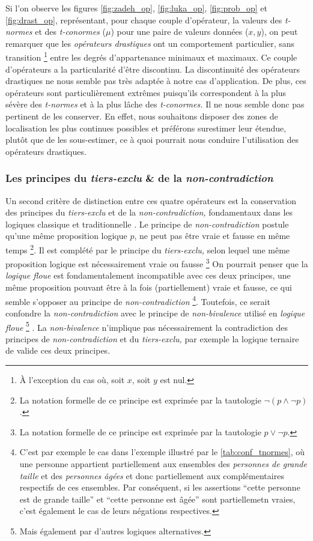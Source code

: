 Si l'on observe les figures \ref{fig:zadeh_op}, \ref{fig:luka_op},
\ref{fig:prob_op} et \ref{fig:drast_op}, représentant, pour chaque
couple d'opérateur, la valeurs des \emph{t-normes} et des
\emph{t-conormes} (\(\mu\)) pour une paire de valeurs données
(\(x,y\)), on peut remarquer que les \emph{opérateurs drastiques} ont
un comportement particulier, sans transition \footnote{À l'exception
  du cas où, soit \(x\), soit \(y\) est nul.} entre les degrés
d’appartenance minimaux et maximaux. Ce couple d'opérateurs a la
particularité d'être discontinu. La discontinuité des opérateurs
drastiques ne nous semble pas très adaptée à notre cas
d’application. De plus, ces opérateurs sont particulièrement extrêmes
puisqu'ils correspondent à la plus sévère des \emph{t-normes} et à la
plus lâche des \emph{t-conormes.} Il ne nous semble donc pas pertinent
de les conserver. En effet, nous souhaitons disposer des zones de
localisation les plus continues possibles et préférons surestimer leur
étendue, plutôt que de les sous-estimer, ce à quoi pourrait nous
conduire l'utilisation des opérateurs drastiques.

\subsubsection{Les principes du \emph{tiers-exclu} \& de la
  \emph{non-contradiction}}

Un second critère de distinction entre ces quatre opérateurs est la
conservation des principes du \emph{tiers-exclu} et de la
\emph{non-contradiction,} fondamentaux dans les logiques classique et
traditionnelle \autocite{Horn2018}. Le principe de
\emph{non-contradiction} postule qu'une même proposition logique
\(p\), ne peut pas être vraie et fausse en même temps \footnote{La
  notation formelle de ce principe est exprimée par la tautologie
  \(\neg(p \wedge \neg p) \).}. Il est complété par le principe du
\emph{tiers-exclu,} selon lequel une même proposition logique est
nécessairement vraie ou fausse \footnote{La notation formelle de ce
  principe est exprimée par la tautologie \(p \vee \neg p\).} On
pourrait penser que la \emph{logique floue} est fondamentalement
incompatible avec ces deux principes, une même proposition pouvant
être à la fois (partiellement) vraie et fausse, ce qui semble
s'opposer au principe de \emph{non-contradiction} \footnote{C'est par
  exemple le cas dans l'exemple illustré par le
  \autoref{tab:conf_tnormes}, où une personne appartient partiellement
  aux ensembles des \emph{personnes de grande taille} et des
  \emph{personnes âgées} et donc partiellement aux complémentaires
  respectifs de ces ensembles. Par conséquent, si les assertions
  \enquote{cette personne est de grande taille} et \enquote{cette
    personne est âgée} sont partiellemetn vraies, c'est également le
  cas de leurs négations respectives.}. Toutefois, ce serait confondre
la \emph{non-contradiction} avec le principe de \emph{non-bivalence}
utilisé en \emph{logique floue} \footnote{Mais également par d'autres
  logiques alternatives.} \autocite{Gottwald2020}. La
\emph{non-bivalence} n'implique pas nécessairement la contradiction
des principes de \emph{non-contradiction} et du \emph{tiers-exclu,}
par exemple la logique ternaire de  valide ces deux
principes.

